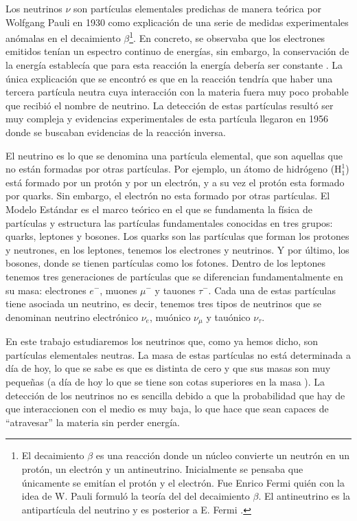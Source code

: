 \documentclass[a4paper,12pt,twoside,titlepage]{article}
\begin{document}
Los neutrinos $\nu$ son partículas elementales predichas de manera teórica por Wolfgang Pauli en 1930 \cite{neutrino_his} como explicación de una serie de medidas experimentales anómalas en el decaimiento $\beta$\footnote{El decaimiento $\beta$ es una reacción donde un núcleo convierte un neutrón en un protón, un electrón y un antineutrino. Inicialmente se pensaba que únicamente se emitían el protón y el electrón. Fue Enrico Fermi quién con la idea de W. Pauli formuló la teoría del del decaimiento $\beta$. El antineutrino es la antipartícula del neutrino y es posterior a E. Fermi \cite{particle_griff}.}. En concreto, se observaba que los electrones emitidos tenían un espectro continuo de energías, sin embargo, la conservación de la energía establecía que para esta reacción la energía debería ser constante \cite{particle_griff}. La única explicación que se encontró es que en la reacción tendría que haber una tercera partícula neutra cuya interacción con la materia fuera muy poco probable que recibió el nombre de neutrino. La detección de estas partículas resultó ser muy compleja y evidencias experimentales de esta partícula llegaron en 1956 donde se buscaban evidencias de la reacción inversa.

El neutrino es lo que se denomina una partícula elemental, que son aquellas que no están formadas por otras partículas. Por ejemplo, un átomo de hidrógeno ($\text{H}^1_1$) está formado por un protón y por un electrón, y a su vez el protón esta formado por quarks. Sin embargo, el electrón no esta formado por otras partículas. El Modelo Estándar es el marco teórico en el que se fundamenta la física de partículas y estructura las partículas fundamentales conocidas en tres grupos: quarks, leptones y bosones. Los quarks son las partículas que forman los protones y neutrones, en los leptones, tenemos los electrones y neutrinos. Y por último, los bosones, donde se tienen partículas como los fotones. 
Dentro de los leptones tenemos tres generaciones de partículas que se diferencian fundamentalmente en su masa: electrones $e^-$, muones $\mu^-$ y tauones $\tau^-$. Cada una de estas partículas tiene asociada un neutrino, es decir, tenemos tres tipos de neutrinos que se denominan neutrino electrónico $\nu_e$, muónico $\nu_\mu$ y tauónico $\nu_\tau$.

En este trabajo estudiaremos los neutrinos que, como ya hemos dicho, son partículas elementales neutras. La masa de estas partículas no está determinada a día de hoy, lo que se sabe es que es distinta de cero y que sus masas son muy pequeñas (a día de hoy lo que se tiene son cotas superiores en la masa \cite{neutrino_mass}). La detección de los neutrinos no es sencilla debido a que la probabilidad que hay de que interaccionen con el medio es muy baja, lo que hace que sean capaces de ``atravesar'' la materia sin perder energía.
\end{document}
